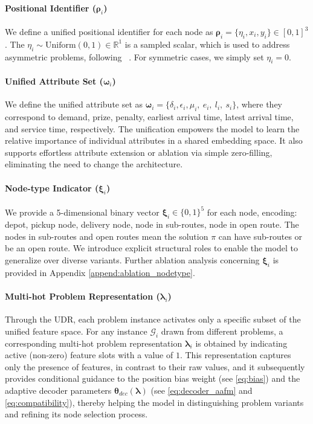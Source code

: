 \documentclass{article}
\theoremstyle{plain}
\theoremstyle{definition}
\theoremstyle{remark}
\begin{document}
\paragraph{Positional Identifier ($\bm{\rho}_{i}$)}
We define a unified positional identifier for each node as $\bm{\rho}_{i}=\{\eta_{i},x_{i},y_{i}\} \in [0,1]^3$. The $\eta_i \sim \mathrm{Uniform}(0,1) \in \mathbb{R}^1$ is a sampled scalar, which is used to address asymmetric problems, following ~\citet{drakulic2023bq}. For symmetric cases, we simply set $\eta_i=0$.
\paragraph{Unified Attribute Set ($\bm{\omega}_{i}$)}
We define the unified attribute set as $\bm{\omega}_{i}=\{\delta_{i},\epsilon_{i}, \mu_{i},\ e_{i}, \ l_{i}, \ s_{i} \}$, where they correspond to demand, prize, penalty, earliest arrival time, latest arrival time, and service time, respectively. The unification empowers the model to learn the relative importance of individual attributes in a shared embedding space. It also supports effortless attribute extension or ablation via simple zero-filling, eliminating the need to change the architecture.
\paragraph{Node-type Indicator ($\bm{\xi}_i$)}
We provide a 5-dimensional binary vector $\bm{\xi}_i \in \{0,1\}^{5}$ for each node, encoding: depot, pickup node, delivery node, node in sub-routes, node in open route. The nodes in sub-routes and open routes mean the solution $\pi$ can have sub-routes or be an open route. We introduce explicit structural roles to enable the model to generalize over diverse variants. Further ablation analysis concerning $\bm{\xi}_i$ is provided in Appendix \ref{append:ablation_nodetype}.
\paragraph{Multi-hot Problem Representation ($\bm{\lambda}_{i}$)}

Through the UDR, each problem instance activates only a specific subset of the unified feature space. For any instance $\mathcal{G}_{i}$ drawn from different problems, a corresponding multi-hot problem representation $\bm{\lambda}_{i}$ is obtained by indicating active (non-zero) feature slots with a value of $1$. This representation captures only the presence of features, in contrast to their raw values, and it subsequently provides conditional guidance to the position bias weight (see \cref{eq:bias}) and the adaptive decoder parameters $\bm{\theta}_{dec}(\bm{\lambda})$ (see \cref{eq:decoder_aafm} and \cref{eq:compatibility}), thereby helping the model in distinguishing problem variants and refining its node selection process.
\end{document}
